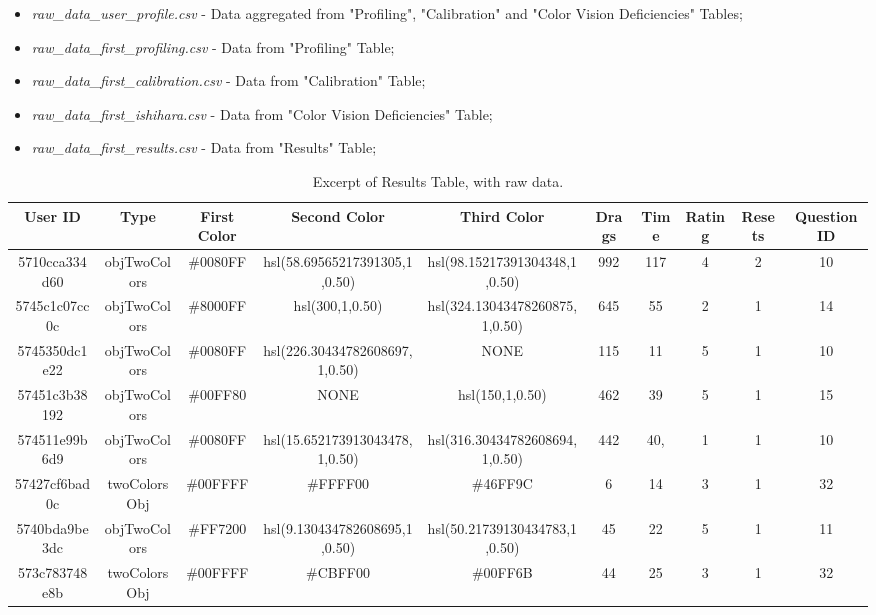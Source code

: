 %
\begin{itemize}
  \item \emph{raw\_data\_user\_profile.csv} - Data aggregated from "Profiling", "Calibration" and "Color Vision Deficiencies" Tables;
  \item \emph{raw\_data\_first\_profiling.csv} - Data from "Profiling" Table;
  \item \emph{raw\_data\_first\_calibration.csv} - Data from "Calibration" Table;
  \item \emph{raw\_data\_first\_ishihara.csv} - Data from "Color Vision Deficiencies" Table;
  \item \emph{raw\_data\_first\_results.csv} - Data from "Results" Table;
\end{itemize} \par
%
\begin{table}[htbp]
  \resizebox{\textwidth}{!} {
  \begin{tabular} {|c|c|c|c|c|c|c|c|c|c|}
    \hline
    User ID & Type & First Color & Second Color & Third Color & Drags & Time & Rating & Resets & Question ID \\ \hline
    5710cca334d60 & objTwoColors & \#0080FF & hsl(58.69565217391305,1,0.50) & hsl(98.15217391304348,1,0.50) & 992 & 117 & 4 & 2 & 10 \\ \hline
    5745c1c07cc0c & objTwoColors & \#8000FF & hsl(300,1,0.50) & hsl(324.13043478260875,1,0.50) & 645 & 55 & 2 & 1 & 14 \\ \hline
    5745350dc1e22 & objTwoColors & \#0080FF & hsl(226.30434782608697,1,0.50) & NONE & 115 & 11 & 5 & 1 & 10 \\ \hline
    57451c3b38192 & objTwoColors & \#00FF80 & NONE & hsl(150,1,0.50) & 462 & 39 & 5 & 1 & 15 \\ \hline
    574511e99b6d9 & objTwoColors & \#0080FF & hsl(15.652173913043478,1,0.50) & hsl(316.30434782608694,1,0.50) & 442 & 40, & 1 & 1 & 10 \\ \hline
    57427cf6bad0c & twoColorsObj & \#00FFFF & \#FFFF00 & \#46FF9C & 6 & 14 & 3 & 1 & 32 \\ \hline
    5740bda9be3dc & objTwoColors & \#FF7200 & hsl(9.130434782608695,1,0.50) & hsl(50.21739130434783,1,0.50) & 45 & 22 & 5 & 1 & 11 \\ \hline
    573c783748e8b & twoColorsObj & \#00FFFF & \#CBFF00 & \#00FF6B & 44 & 25 & 3 & 1 & 32 \\
    \hline
  \end{tabular}}
  \caption[Excerpt of Raw "Results" Table]{Excerpt of Results Table, with raw data.}
  \label{table:csv_resultsraw}
\end{table} \par

